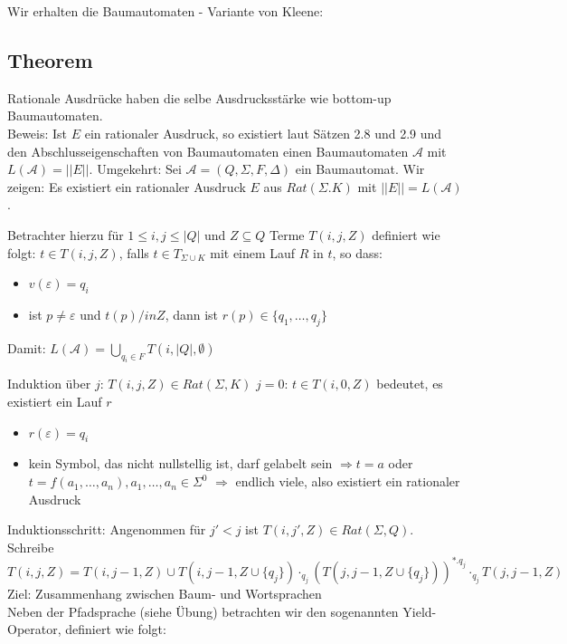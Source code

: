 \documentclass[titlepage]{article}
\begin{document}
Wir erhalten die \glqq Baumautomaten \grqq - Variante von Kleene:\\

\subsection{Theorem}

Rationale Ausdr\"ucke haben die selbe Ausdrucksst\"arke wie bottom-up Baumautomaten.\\
Beweis: Ist $E$ ein rationaler Ausdruck, so existiert laut S\"atzen 2.8 und 2.9 und den 
Abschlusseigenschaften von Baumautomaten einen Baumautomaten $\mathcal{A}$ mit $L(\mathcal{A}) = ||E||$.
Umgekehrt: Sei $\mathcal{A} = (Q, \Sigma, F, \Delta)$ ein Baumautomat.
Wir zeigen: Es existiert ein rationaler Ausdruck $E$ aus $Rat(\Sigma. K)$ mit $||E|| = L(\mathcal{A})$.

Betrachter hierzu f\"ur $1 \leq i,j \leq |Q|$ und $Z \subseteq Q$ Terme $T(i, j, Z)$ definiert wie folgt:
$t \in T(i, j, Z)$, falls $t \in T_{\Sigma \cup K}$ mit einem Lauf $R$ in $t$, so dass:
\begin{itemize}
    \item $v(\varepsilon) = q_i$
    \item ist $p \neq \varepsilon$ und $t(p) /in Z$, dann ist $r(p) \in \{q_1, \dots, q_j\}$
\end{itemize}

Damit: $L(\mathcal{A}) = \bigcup\limits_{q_i \in F} T(i, |Q|, \emptyset)$

Induktion \"uber $j$: $T(i, j, Z) \in Rat(\Sigma, K)$
$j = 0$: $t \in T(i, 0, Z)$ bedeutet, es existiert ein Lauf $r$
\begin{itemize}
    \item $r(\varepsilon) = q_i$
    \item kein Symbol, das nicht nullstellig ist, darf gelabelt sein
        $\Rightarrow t = a$ oder $t = f(a_1, \dots, a_n), a_1, \dots, a_n \in \Sigma^0$
        $\Rightarrow$ endlich viele, also existiert ein rationaler Ausdruck
\end{itemize}

Induktionsschritt: Angenommen f\"ur $j' < j$ ist $T(i, j', Z) \in Rat(\Sigma, Q)$.\\
Schreibe $T(i, j, Z) = T(i, j-1, Z) \cup T(i, j-1, Z \cup \{q_j\}) \cdot_{q_j} (T(j, j-1, Z \cup \{q_j\}))^{\ast . q_j} \cdot_{q_j} T(j, j-1, Z)$\\

Ziel: Zusammenhang zwischen Baum- und Wortsprachen\\
Neben der Pfadsprache (siehe \"Ubung) betrachten wir den sogenannten Yield-Operator, definiert wie folgt:
\end{document}
